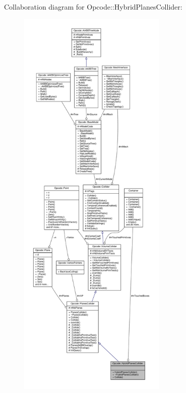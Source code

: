 Collaboration diagram for Opcode\+:\+:Hybrid\+Planes\+Collider\+:
\nopagebreak
\begin{figure}[H]
\begin{center}
\leavevmode
\includegraphics[height=550pt]{da/d2f/classOpcode_1_1HybridPlanesCollider__coll__graph}
\end{center}
\end{figure}
